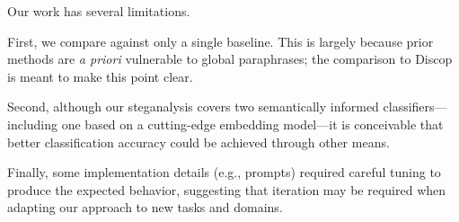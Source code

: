Our work has several limitations.

First, we compare against only a single baseline. This is largely because prior methods are \emph{a priori} vulnerable to global paraphrases; the comparison to Discop is meant to make this point clear.

Second, although our steganalysis covers two semantically informed classifiers---including one based on a cutting-edge embedding model---it is conceivable that better classification accuracy could be achieved through other means.

Finally, some implementation details (e.g., prompts) required careful tuning to produce the expected behavior, suggesting that iteration may be required when adapting our approach to new tasks and domains.



